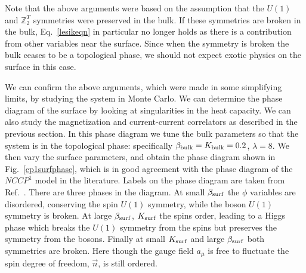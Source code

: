 \documentclass[prb,twocolumn]{revtex4-1}
\def\ztwot{\mathbb{Z}_2^T}
\begin{document}
Note that the above arguments were based on the assumption that the $U(1)$ and $\ztwot$ symmetries were preserved in the bulk. If these symmetries are broken in the bulk, Eq.~\ref{lesikeqn} in particular no longer holds as there is a contribution from other variables near the surface. Since when the symmetry is broken the bulk ceases to be a topological phase, we should not expect exotic physics on the surface in this case.

We can confirm the above arguments, which were made in some simplifying limits, by studying the system in Monte Carlo. We can determine the phase diagram of the surface by looking at singularities in the heat capacity. We can also study the magnetization and current-current correlators as described in the previous section. In this phase diagram we tune the bulk parameters so that the system is in the topological phase: specifically $\beta_{\rm bulk}=K_{\rm bulk}=0.2$, $\lambda=8$. We then vary the surface parameters, and obtain the phase diagram shown in Fig.~\ref{cp1surfphase}, which is in good agreement with the phase diagram of the $NCCP^1$ model in the literature. Labels on the phase diagram are taken from Ref.~.
There are three phases in the diagram. At small $\beta_{\rm surf}$ the $\phi$ variables are disordered, conserving the spin $U(1)$ symmetry, while the boson $U(1)$ symmetry is broken. At large $\beta_{\rm surf}$, $K_{\rm surf}$ the spins order, leading to a Higgs phase which breaks the $U(1)$ symmetry from the spins but preserves the symmetry from the bosons. Finally at small $K_{\rm surf}$ and large $\beta_{\rm surf}$ both symmetries are broken. Here though the gauge field $a_\mu$ is free to fluctuate the spin degree of freedom, $\vec{n}$, is still ordered.
\end{document}
